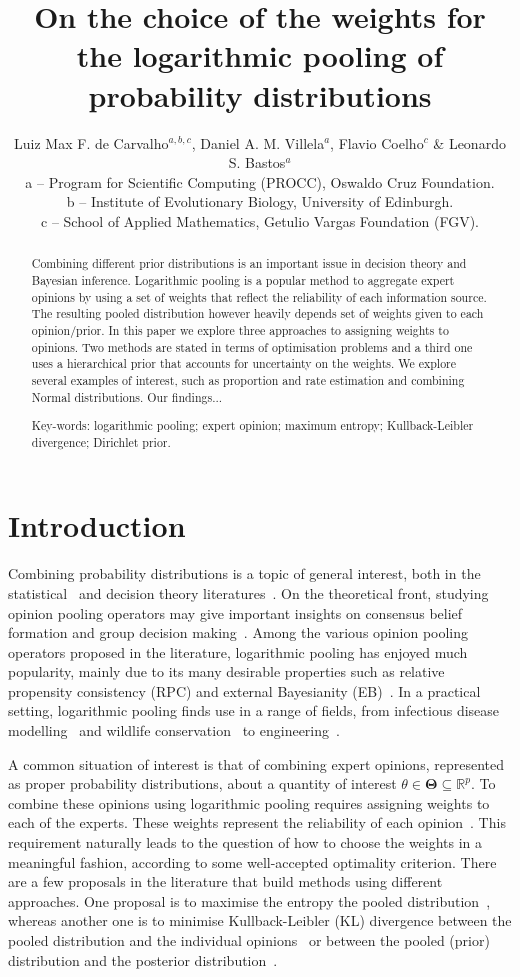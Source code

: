 \documentclass[a4paper, notitlepage, 10pt]{article}
\title{\vspace{-9ex}\centering \bf On the choice of the weights for the logarithmic pooling of probability distributions}
\author{
Luiz Max F. de Carvalho$^{a,b,c}$, Daniel A. M. Villela$^a$, Flavio Coelho$^c$ \& Leonardo S. Bastos$^a$ \\
a -- Program for Scientific Computing (PROCC), Oswaldo Cruz Foundation. \\
b -- Institute of Evolutionary Biology, University of Edinburgh.\\
c -- School of Applied Mathematics, Getulio Vargas Foundation (FGV).
}
\begin{document}
\maketitle

\begin{abstract}
Combining different prior distributions is an important issue in decision theory and Bayesian inference.
Logarithmic pooling is a popular method to aggregate expert opinions by using a set of weights that reflect the reliability of each information source.
The resulting pooled distribution however heavily depends set of weights given to each opinion/prior.
In this paper we explore three approaches to assigning weights to opinions.
Two methods are stated in terms of optimisation problems and a third one uses a hierarchical prior that accounts for uncertainty on the weights. 
We explore several examples of interest, such as proportion and rate estimation and combining Normal distributions.
Our findings...

Key-words: logarithmic pooling; expert opinion; maximum entropy; Kullback-Leibler divergence; Dirichlet prior. 
\end{abstract}

\section*{Introduction}

Combining probability distributions is a topic of general interest, both in the statistical~\citep{west1984, genest1986A, genest1986B} and decision theory literatures~\citep{genest1984}.
On the theoretical front, studying opinion pooling operators may give important insights on consensus belief formation and group decision making~\citep{genest1986B}.
Among the various opinion pooling operators proposed in the literature, logarithmic pooling has enjoyed much popularity, mainly due to its many desirable properties such as relative propensity consistency (RPC) and external Bayesianity (EB)~\citep{genest1986A}. 
In a practical setting, logarithmic pooling finds use in a range of fields, from infectious disease modelling~\citep{Coelho2009} and wildlife conservation~\citep{poole2000} to engineering~\citep{lind1988, savchuk1994}.

A common situation of interest is that of combining expert opinions, represented as proper probability distributions, about a quantity of interest $\theta \in \mathbf{\Theta} \subseteq \mathbb{R}^p$.
To combine these opinions using logarithmic pooling requires assigning weights to each of the experts.
These weights represent the reliability of each opinion~\citep{genest1984}.
This requirement naturally leads to the question of how to choose the weights in a meaningful fashion, according to some well-accepted optimality criterion.
There are a few proposals in the literature that build methods using different approaches.
One proposal is to maximise the entropy the pooled distribution~\citep{myung1996}, whereas another one is to minimise Kullback-Leibler (KL) divergence between the pooled distribution and the individual opinions~\citep{abbas2009} or between the pooled (prior) distribution and the posterior distribution~\citep{rufo2012A,rufo2012B}.
\end{document}
